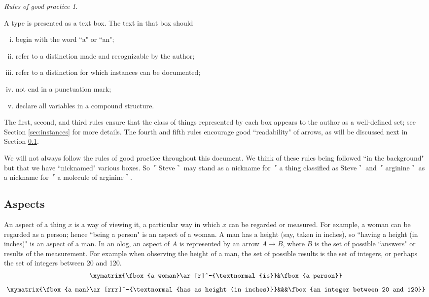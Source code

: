 \documentclass{amsart}
\def\to{\rightarrow}
\newcommand{\LA}[2]{\ar[#1]^-{\tn {#2}}}
\newcommand{\fakebox}[1]{\tn{$\ulcorner$#1$\urcorner$}}
\theoremstyle{remark}
\newtheorem{rules}[theorem]{Rules of good practice}
\theoremstyle{definition}
\def\tn{\textnormal}
\begin{document}
\begin{rules}\label{rules:types}

A type is presented as a text box. The text in that box should 
\begin{enumerate}[(i)]\item begin with the word ``a" or ``an";\item refer to a distinction made and recognizable by the author;\item refer to a distinction for which instances can be documented;\item not end in a punctuation mark;\item declare all variables in a compound structure. \end{enumerate}

\end{rules}

The first, second, and third rules ensure that the class of things represented by each box appears to the author as a well-defined set; see Section \ref{sec:instances} for more details. The fourth and fifth rules encourage good ``readability" of arrows, as will be discussed next in Section \ref{sec:aspects}. 

We will not always follow the rules of good practice throughout this document. We think of these rules being followed ``in the background" but that we have ``nicknamed" various boxes. So \fakebox{Steve} may stand as a nickname for \fakebox{a thing classified as Steve} and \fakebox{arginine} as a nickname for \fakebox{a molecule of arginine}.

\subsection{Aspects}\label{sec:aspects}

An aspect of a thing $x$ is a way of viewing it, a particular way in which $x$ can be regarded or measured. For example, a woman can be regarded as a person; hence ``being a person" is an aspect of a woman. A man has a height (say, taken in inches), so ``having a height (in inches)" is an aspect of a man. In an olog, an aspect of $A$ is represented by an arrow $A\to B$, where $B$ is the set of possible ``answers" or results of the measurement. For example when observing the height of a man, the set of possible results is the set of integers, or perhaps the set of integers between 20 and 120. \begin{align}\label{dia:aspect 1}\xymatrix{\fbox{a woman}\LA{r}{is}&\fbox{a person}}\end{align}\begin{align}\label{dia:aspect 2}\xymatrix{\fbox{a man}\LA{rrr}{has as height (in inches)}&&&\fbox{an integer between 20 and 120}}\end{align}
\end{document}
